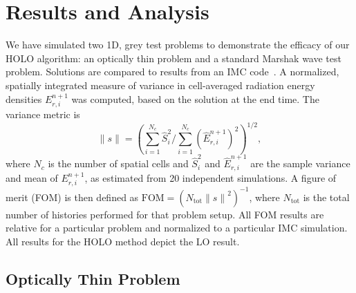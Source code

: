 \documentclass{anstrans}
\newcommand{\FOM}{\ensuremath{\text{FOM}}}
\renewcommand{\ss}{\ensuremath{\|s\|}}
\begin{document}
\section*{Results and Analysis}

We have simulated two 1D, grey test problems to demonstrate the efficacy of our HOLO
algorithm: an optically thin problem and a standard Marshak wave test problem.  Solutions are compared to results from an IMC code~\cite{jayenne}.
A normalized, spatially integrated measure of variance in cell-averaged radiation energy
densities $E_{r,i}^{n+1}$ was computed, based on the solution at the end time. The variance metric is
\begin{equation}
    \ss = \left({{\sum\limits_{i=1}^{N_c}
\hat S_i^2}\bigg/{\sum\limits_{i=1}^{N_c} \left(\hat{E}_{r,i}^{n+1}\right)^2}}\right)^{1/2},
\end{equation}
where $N_c$ is the number of spatial cells and $\hat S_i^2$ and $\hat E_{r,i}^{n+1}$ are the
sample variance and mean of $E_{r,i}^{n+1}$, as estimated from 20 independent simulations.  A figure of merit (FOM) is
then defined as $\FOM = \left({N_{\text{tot}}\ss^2}\right)^{-1}$,
where $N_{\text{tot}}$ is the total number of histories performed for that problem setup. All FOM results
are relative for a particular problem and normalized to a particular IMC
simulation. All results for the HOLO method depict the LO result.

\subsection{Optically Thin Problem}
\end{document}
